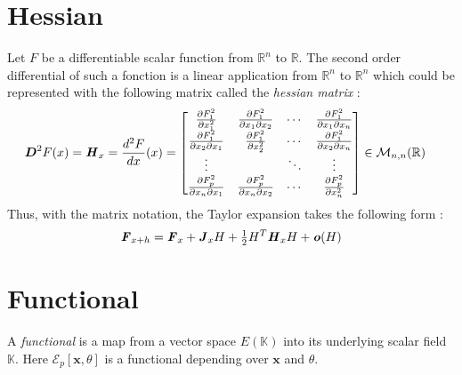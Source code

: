 \section{Hessian}
Let $F$ be a differentiable scalar function from $\mathbb{R}^n$ to $\mathbb{R}$. The second order differential of such a fonction is a linear application from $\mathbb{R}^n$ to $\mathbb{R}^n$ which could be represented with the following matrix called the \emph{hessian matrix} :
\begin{align}
	&\boldsymbol{D}^{2}F(x) = \boldsymbol{\mathit{H}}_{x} = \frac{d^2F}{dx}(x) =
	\begin{bmatrix}
		\frac{\partial F^2_1}{\partial x_1^2} & \frac{\partial F^2_1}{\partial x_1\partial x_2} &\cdots & \frac{\partial F^2_1}{\partial x_1\partial x_n} \\
		\frac{\partial F^2_1}{\partial x_2\partial x_1} & \frac{\partial F^2_1}{\partial x_2^2} &\cdots & \frac{\partial F^2_1}{\partial x_2\partial x_n} \\
		\vdots & &\ddots & \vdots \\
		\frac{\partial F^2_p}{\partial x_n\partial x_1} & \frac{\partial F^2_p}{\partial x_n\partial x_2}&\cdots & \frac{\partial F^2_p}{\partial x_n^2}
	\end{bmatrix}
	\in\mathcal{M}_{n,n}(\mathbb{R})
\end{align}
Thus, with the matrix notation, the Taylor expansion takes the following form :
\begin{align}
	\boldsymbol{\mathit{F}}_{x+h} = \boldsymbol{\mathit{F}}_{x} +  \boldsymbol{\mathit{J}}_{x} H + \tfrac{1}{2}H^T \boldsymbol{\mathit{H}}_{x} H + \boldsymbol{\mathit{o}}(H)
\end{align}


\section{Functional}
A \emph{functional} is a map from a vector space $E(\mathbb{K})$ into its underlying scalar field $\mathbb{K}$. Here $\mathcal{E}_p[\boldsymbol{x},\theta]$ is a functional depending over $\boldsymbol{x}$ and $\theta$.






